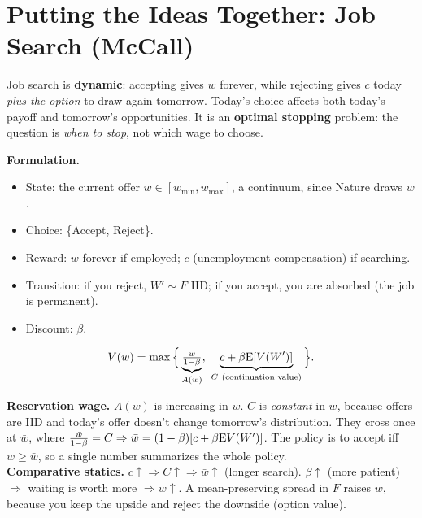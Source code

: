 \documentclass[10pt]{article}
\begin{document}
\section{Putting the Ideas Together: Job Search (McCall)}

\begin{bigidea}
Job search is \textbf{dynamic}: accepting gives $w$ forever, while rejecting gives $c$ today \emph{plus the option} to draw again tomorrow. Today's choice affects both today's payoff and tomorrow's opportunities. It is an \textbf{optimal stopping} problem: the question is \emph{when to stop}, not which wage to choose.
\end{bigidea}

\begin{minipage}{0.55\textwidth}
\textbf{Formulation.}
\begin{itemize}
\item State: the current offer $w\in[w_{\min},w_{\max}]$, a continuum, since Nature draws $w$.
\item Choice: \{Accept, Reject\}.
\item Reward: $w$ forever if employed; $c$ (unemployment compensation) if searching.
\item Transition: if you reject, $W'\sim F$ IID; if you accept, you are absorbed (the job is permanent).
\item Discount: $\beta$.
\end{itemize}
\[V(w)=\max\Big\{\underbrace{\tfrac{w}{1-\beta}}_{A(w)},\ \underbrace{c+\beta\E[V(W')]}_{C\ (\text{continuation value})}\Big\}.\]
\end{minipage}\hfill
\begin{minipage}{0.42\textwidth}\centering
\figMcCall
\end{minipage}

\textbf{Reservation wage.} $A(w)$ is increasing in $w$. $C$ is \emph{constant} in $w$, because offers are IID and today's offer doesn't change tomorrow's distribution. They cross once at $\bar w$, where $\frac{\bar w}{1-\beta}=C\Rightarrow\bar w=(1-\beta)[c+\beta\mathrm{E} V(W')]$. The policy is to accept iff $w\ge\bar w$, so a single number summarizes the whole policy.\\
\textbf{Comparative statics.} $c\uparrow\Rightarrow C\uparrow\Rightarrow\bar w\uparrow$ (longer search). $\beta\uparrow$ (more patient) $\Rightarrow$ waiting is worth more $\Rightarrow\bar w\uparrow$. A mean-preserving spread in $F$ raises $\bar w$, because you keep the upside and reject the downside (option value).
\end{document}

